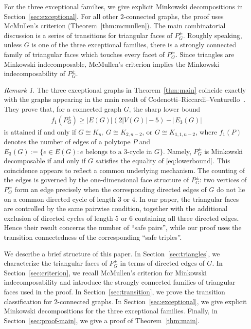 \documentclass[11pt,a4paper]{amsart}
\theoremstyle{definition}
\theoremstyle{remark}
\newtheorem{remark}[theorem]{Remark}
\begin{document}
{For the three exceptional families, we give explicit Minkowski decompositions in Section~\ref{sec:exceptional}. 
For all other $2$-connected graphs, the proof uses McMullen's criterion (Theorem~\ref{thm:mcmullen}). 
The main combinatorial discussion is a series of transitions for triangular faces of $P_G^{\pm}$. 
Roughly speaking, unless $G$ is one of the three exceptional families, there is a strongly connected family of triangular faces which touches every facet of $P_G^{\pm}$. 
Since triangles are Minkowski indecomposable, McMullen's criterion implies the Minkowski indecomposability of $P_G^{\pm}$. 

\begin{remark}\label{rem:CRV-connection}
The three exceptional graphs in Theorem~\ref{thm:main} coincide exactly with the graphs appearing in the main result of Codenotti--Riccardi--Venturello~\cite[Corollary~4.3]{CRV}. 
They prove that, for a connected graph $G$, the sharp lower bound 
\begin{align}\label{eq:lowerbound} f_1(P_G^{\pm})\ge |E(G)|(2|V(G)|-5)-|E_3(G)| \end{align}
is attained if and only if $G\cong K_n$, $G\cong K_{2,n-2}$, or $G\cong K_{1,1,n-2}$, 
where $f_1(P)$ denotes the number of edges of a polytope $P$ and $E_3(G):=\{e \in E(G) : e \text{ belongs to a $3$-cycle in }G\}$. 
Namely, $P_G^\pm$ is Minkowski decomposable if and only if $G$ satisfies the equality of \eqref{eq:lowerbound}. 
This coincidence appears to reflect a common underlying mechanism. 
The counting of the edges is governed by the one-dimensional face structure of $P_G^\pm$: 
two vertices of $P_G^\pm$ form an edge precisely when the corresponding directed edges of $G$ do not lie on a common directed cycle of length $3$ or $4$. 
In our paper, the triangular faces are controlled by the same pairwise condition, 
together with the additional exclusion of directed cycles of length $5$ or $6$ containing all three directed edges. 
Hence their result concerns the number of ``safe pairs'', while our proof uses the transition connectedness of the corresponding ``safe triples''. 
\end{remark}

\medskip

We describe a brief structure of this paper. 
In Section~\ref{sec:triangles}, we characterize the triangular faces of $P_G^{\pm}$ in terms of directed edges of $G$. 
In Section~\ref{sec:criterion}, we recall McMullen's criterion for Minkowski indecomposability and introduce the strongly connected families of triangular faces used in the proof. 
In Section~\ref{sec:transition}, we prove the transition classification for $2$-connected graphs. 
In Section~\ref{sec:exceptional}, we give explicit Minkowski decompositions for the three exceptional families. 
Finally, in Section~\ref{sec:proof-main}, we give a proof of Theorem~\ref{thm:main}. 

}
\end{document}
